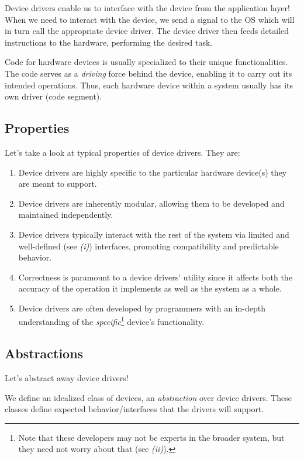 \documentclass{report}
\newcommand{\abstractionBegin}[1]{\begin{tcolorbox}[colback=violet!5!white,colframe=violet,title={Abstraction:
      #1}]}
\newcommand{\abstractionEnd}{\end{tcolorbox}}
\begin{document}
Device drivers enable us to interface with the device from the application layer! When we need to
interact with the device, we send a signal to the OS which will in turn call the appropriate device
driver. The device driver then feeds detailed instructions to the hardware, performing the desired task.

Code for hardware devices is usually specialized to their unique functionalities. The code serves as
a \textit{driving} force behind the device, enabling it to carry out its intended operations. Thus,
each hardware device within a system usually has its own driver (code segment).


\subsection{Properties}
Let's take a look at typical properties of device drivers. They are:

\begin{enumerate}[label=\textit{(\roman*)}]
\item Device drivers are highly specific to the particular hardware device(s) they are meant to
  support.
\item Device drivers are inherently modular, allowing them to be developed and maintained independently.
\item Device drivers typically interact with the rest of the system via limited and well-defined
  (see \textit{(i)}) interfaces, promoting compatibility and predictable behavior.
\item Correctness is paramount to a device drivers' utility since it affects both the accuracy of
  the operation it implements as well as the system as a whole.
\item Device drivers are often developed by programmers with an in-depth understanding of the
  \textit{specific}\footnote{Note that these developers may not be experts in the broader system, but they
    need not worry about that (see \textit{(ii)}).} device's functionality.
\end{enumerate}


\subsection{Abstractions}
Let's abstract away device drivers!

\abstractionBegin{Driver Abstractions}
We define an idealized class of devices, an \textit{abstraction} over device drivers. These classes
define expected behavior/interfaces that the drivers will support.
\abstractionEnd
\end{document}
